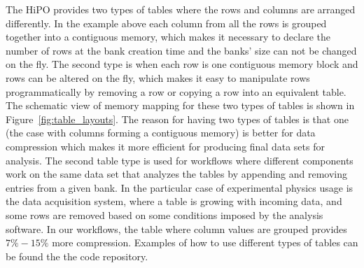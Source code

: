 The HiPO provides two types of tables where the rows and columns are arranged differently. In the example above
each column from all the rows is grouped together into a contiguous memory, which makes it necessary to declare 
the number of rows at the bank creation time and the banks' size can not be changed on the fly. The second type
is when each row is one contiguous memory block and rows can be altered on the fly, which makes it easy to manipulate
rows programmatically by removing a row or copying a row into an equivalent table. The schematic view of memory
mapping for these two types of tables is shown in Figure~\ref{fig:table_layouts}. The reason for having two types of
tables is that one (the case with columns forming a contiguous memory) is better for data compression which makes
it more efficient for producing final data sets for analysis. The second table type is used for workflows where different
components work on the same data set that analyzes the tables by appending and removing entries from a given bank.
In the particular case of experimental physics usage is the data acquisition system, where a table is growing with incoming
data, and some rows are removed based on some conditions imposed by the analysis software. In our workflows, the table
where column values are grouped provides $7\%-15\%$ more compression. Examples of how to use different types of tables
can be found the the code repository.








